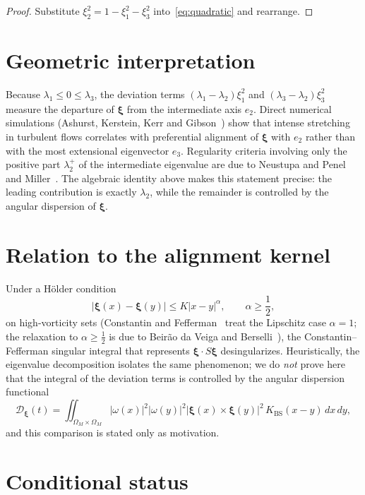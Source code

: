 \documentclass[11pt,a4paper]{article}
\begin{document}
\begin{proof}
Substitute \(\xi_2^2=1-\xi_1^2-\xi_3^2\) into~\eqref{eq:quadratic} and rearrange.
\end{proof}

\section{Geometric interpretation}

Because \(\lambda_1\le 0\le\lambda_3\), the deviation terms \((\lambda_1-\lambda_2)\xi_1^2\) and \((\lambda_3-\lambda_2)\xi_3^2\) measure the departure of \(\boldsymbol{\xi}\) from the intermediate axis \(e_2\). Direct numerical simulations (Ashurst, Kerstein, Kerr and Gibson~\cite{AKKG1987}) show that intense stretching in turbulent flows correlates with preferential alignment of \(\boldsymbol{\xi}\) with \(e_2\) rather than with the most extensional eigenvector \(e_3\). Regularity criteria involving only the positive part \(\lambda_2^+\) of the intermediate eigenvalue are due to Neustupa and Penel~\cite{NeustupaPenel2001,NeustupaPenel2003,NeustupaPenel2005} and Miller~\cite{Miller2020,Miller2020Addendum}. The algebraic identity above makes this statement precise: the leading contribution is exactly \(\lambda_2\), while the remainder is controlled by the angular dispersion of \(\boldsymbol{\xi}\).

\section{Relation to the alignment kernel}

Under a Hölder condition
\[
|\boldsymbol{\xi}(x)-\boldsymbol{\xi}(y)|\le K|x-y|^\alpha,\qquad\alpha\ge\frac12,
\]
on high-vorticity sets (Constantin and Fefferman~\cite{ConstantinFefferman1993} treat the Lipschitz case \(\alpha=1\); the relaxation to \(\alpha\ge\frac12\) is due to Beir\~ao da Veiga and Berselli~\cite{BeiraoBerselli2002}), the Constantin--Fefferman singular integral that represents \(\boldsymbol{\xi}\cdot S\boldsymbol{\xi}\) desingularizes. Heuristically, the eigenvalue decomposition isolates the same phenomenon; we do \emph{not} prove here that the integral of the deviation terms is controlled by the angular dispersion functional
\[
\mathcal{D}_{\boldsymbol{\xi}}(t)=\iint_{\Omega_M\times\Omega_M}|\omega(x)|^2|\omega(y)|^2|\boldsymbol{\xi}(x)\times\boldsymbol{\xi}(y)|^2\,K_{\mathrm{BS}}(x-y)\,dx\,dy,
\]
and this comparison is stated only as motivation.

\section{Conditional status}
\end{document}
